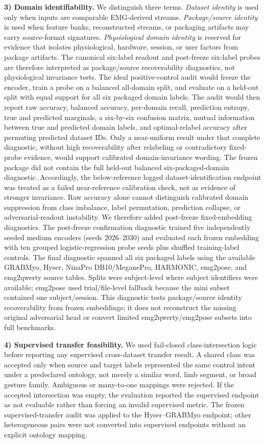 \documentclass[journal]{IEEEtran}
\begin{document}
\textbf{3) Domain identifiability.} We distinguish three terms. \emph{Dataset identity} is used only when inputs are comparable EMG-derived streams. \emph{Package/source identity} is used when feature banks, reconstructed streams, or packaging artifacts may carry source-format signatures. \emph{Physiological domain identity} is reserved for evidence that isolates physiological, hardware, session, or user factors from package artifacts. The canonical six-label readout and post-freeze six-label probes are therefore interpreted as package/source recoverability diagnostics, not physiological invariance tests. The ideal positive-control audit would freeze the encoder, train a probe on a balanced all-domain split, and evaluate on a held-out split with equal support for all six packaged domain labels. The audit would then report raw accuracy, balanced accuracy, per-domain recall, prediction entropy, true and predicted marginals, a six-by-six confusion matrix, mutual information between true and predicted domain labels, and optimal-relabel accuracy after permuting predicted dataset IDs. Only a near-uniform result under that complete diagnostic, without high recoverability after relabeling or contradictory fixed-probe evidence, would support calibrated domain-invariance wording. The frozen package did not contain the full held-out balanced six-packaged-domain diagnostic. Accordingly, the below-reference logged dataset-identification endpoint was treated as a failed near-reference calibration check, not as evidence of stronger invariance. Raw accuracy alone cannot distinguish calibrated domain suppression from class imbalance, label permutation, prediction collapse, or adversarial-readout instability. We therefore added post-freeze fixed-embedding diagnostics. The post-freeze confirmation diagnostic trained five independently seeded medium encoders (seeds 2026--2030) and evaluated each frozen embedding with ten grouped logistic-regression probe seeds plus shuffled training-label controls. The final diagnostic spanned all six packaged labels using the available GRABMyo, Hyser, NinaPro DB10/MeganePro, HARMONIC, emg2pose, and emg2qwerty source tables. Splits were subject-level where subject identifiers were available; emg2pose used trial/file-level fallback because the mini subset contained one subject/session. This diagnostic tests package/source identity recoverability from frozen embeddings; it does not reconstruct the missing original adversarial head or convert limited emg2qwerty/emg2pose subsets into full benchmarks.

\textbf{4) Supervised transfer feasibility.} We used fail-closed class-intersection logic before reporting any supervised cross-dataset transfer result. A shared class was accepted only when source and target labels represented the same control intent under a predeclared ontology, not merely a similar word, limb segment, or broad gesture family. Ambiguous or many-to-one mappings were rejected. If the accepted intersection was empty, the evaluation reported the supervised endpoint as not evaluable rather than forcing an invalid supervised metric. The frozen supervised-transfer audit was applied to the Hyser--GRABMyo endpoint; other heterogeneous pairs were not converted into supervised endpoints without an explicit ontology mapping.
\end{document}

